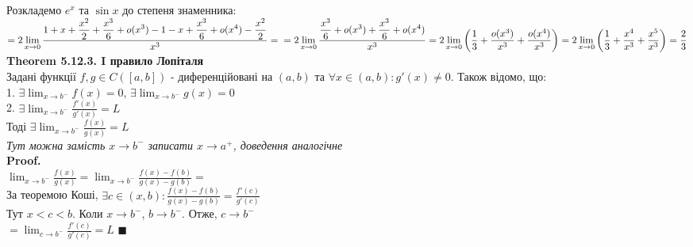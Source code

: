 \documentclass[a4paper, 14pt]{extarticle}
\def\huge{\displaystyle}
\def\bigline{\vspace{5mm}\\}
\def\th#1{\textbf{Theorem {#1}}}
\def\proof{\textbf{Proof.}\\}
\def\bigline{\vspace{5mm}\\}
\def\qed{$\blacksquare$}
\begin{document}
Розкладемо $e^x$ та $\sin x$ до степеня знаменника:\\
$= \huge 2\lim_{x \to 0} \frac{\displaystyle 1 + x + \frac{x^2}{2} + \frac{x^3}{6} + o(x^3) - 1 - x + \frac{x^3}{6} + o(x^4) - \frac{x^2}{2}}{x^3} = \\ = 2\lim_{x \to 0} \frac{\displaystyle \frac{x^3}{6} + o(x^3) + \frac{x^3}{6} + o(x^4)}{x^3} = 2 \lim_{x \to 0} \left(\frac{1}{3} + \frac{o(x^3)}{x^3} + \frac{o(x^4)}{x^3} \right) = \\ 2 \lim_{x \to 0} \left(\frac{1}{3} + \frac{x^4}{x^3} + \frac{x^5}{x^3} \right) = \frac{2}{3}$
\bigline
\th{5.12.3. I правило Лопіталя}\\
Задані функції $f,g \in C([a,b])$ - диференційовані на $(a,b)$ та $\forall x \in (a,b): g'(x) \neq 0$. Також відомо, що:\\
1. $\exists \huge \lim_{x \to b^-} f(x) = 0$, $\exists \huge \lim_{x \to b^-} g(x) = 0$\\
2. $\exists \huge \lim_{x \to b^-} \frac{f'(x)}{g'(x)} = L$\\
Тоді $\exists \huge \lim_{x \to b^-} \frac{f(x)}{g(x)} = L$\\
\textit{Тут можна замість $x \to b^-$ записати $x \to a^+$, доведення аналогічне}\\
\proof
$\huge \lim_{x \to b^-} \frac{f(x)}{g(x)} = \lim_{x \to b^-} \frac{f(x)-f(b)}{g(x)-g(b)} =$\\
За теоремою Коші, $\exists c \in (x, b): \huge \frac{f(x)-f(b)}{g(x)-g(b)} = \frac{f'(c)}{g'(c)}$\\
Тут $x < c < b$. Коли $x \to b^-$, $b \to b^-$. Отже, $c \to b^-$\\
$= \huge \lim_{c \to b^-} \frac{f'(c)}{g'(c)} = L$ \qed
\bigline
\end{document}
